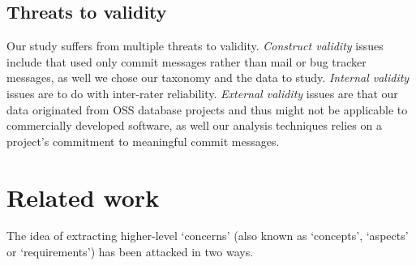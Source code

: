 \documentclass{acm_proc_article-sp}
\begin{document}
\subsection{Threats to validity}

Our study suffers from multiple threats to validity. \emph{Construct validity} issues include that used only commit messages rather than mail or bug tracker messages, as well we chose our taxonomy and the data to study. \emph{Internal validity} issues are to do with inter-rater reliability. \emph{External validity} issues are that our data originated from OSS database projects and thus might not be applicable to commercially developed software, as well our analysis techniques relies on a project's commitment to meaningful commit messages.

\section{Related work}

The idea of extracting higher-level `concerns' (also known as `concepts', `aspects' or `requirements') has been attacked in two ways. 
\end{document}
